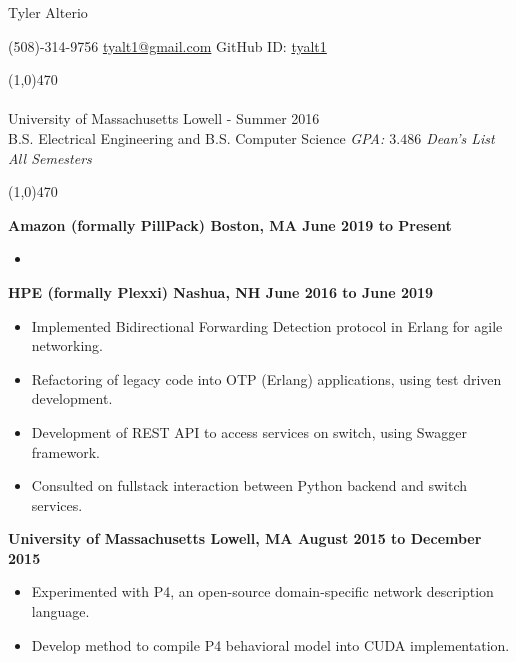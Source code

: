 \documentclass[11pt, a4paper]{article} %
\newcommand{\tinybullet}{ {\tiny \textbullet} }
\begin{document}
\centerline{\Huge \sc Tyler Alterio}

\centerline{
(508)-314-9756 \tinybullet \hspace{1pt}
\href{mailto:tyalt1@gmail.com}{tyalt1@gmail.com} \tinybullet \hspace{1pt}
GitHub ID: \href{http://www.github.com/tyalt1}{tyalt1}
}

\noindent \line(1,0){470}\\

\smallskip \\
University of Massachusetts Lowell - Summer 2016 \\
B.S. Electrical Engineering and B.S. Computer Science
\hfill {\it GPA: $3.486$ \tinybullet \hspace{1pt} Dean's List All Semesters}

\noindent \line(1,0){470}\\

\vspace{5pt}

\centerline{\bf Amazon (formally PillPack) \tinybullet \hspace{1pt} Boston, MA \hfill June 2019 to Present}
\begin{itemize}
\itemsep0em
	\item
\end{itemize}

\centerline{\bf HPE (formally Plexxi) \tinybullet \hspace{1pt} Nashua, NH \hfill June 2016 to June 2019}
\begin{itemize}
\itemsep0em
	\item Implemented Bidirectional Forwarding Detection protocol in Erlang for agile networking.
	\item Refactoring of legacy code into OTP (Erlang) applications, using test driven development.
	\item Development of REST API to access services on switch, using Swagger framework.
	\item Consulted on fullstack interaction between Python backend and switch services.
\end{itemize}

\centerline{\bf University of Massachusetts \tinybullet \hspace{1pt} Lowell, MA \hfill August 2015 to December 2015}
\begin{itemize}
\itemsep0em
	\item Experimented with P4, an open-source domain-specific network description language.
	\item Develop method to compile P4 behavioral model into CUDA implementation.
\end{itemize}
\end{document}
